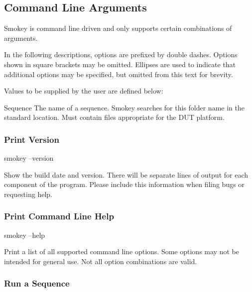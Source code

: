 \subsection{Command Line Arguments}
\label{subsec:CmdArgs}

Smokey is command line driven and only supports certain combinations of
arguments.

In the following descriptions, options are prefixed by double dashes.  Options
shown in square brackets may be omitted.  Ellipses are used to indicate that
additional options may be specified, but omitted from this text for brevity.

Values to be supplied by the user are defined below:

\begin{Definition}

\item[Sequence] The name of a sequence.  Smokey searches for this folder name
in the standard location.  Must contain files appropriate for the DUT platform.

\end{Definition}

\subsubsection{Print Version}

\begin{CommandLine}
smokey --version
\end{CommandLine}

Show the build date and version.  There will be separate lines of output for
each component of the program.  Please include this information when filing
bugs or requesting help.

\subsubsection{Print Command Line Help}

\begin{CommandLine}
smokey --help
\end{CommandLine}

Print a list of all supported command line options.  Some options may not be
intended for general use.  Not all option combinations are valid.

\subsubsection{Run a Sequence}

